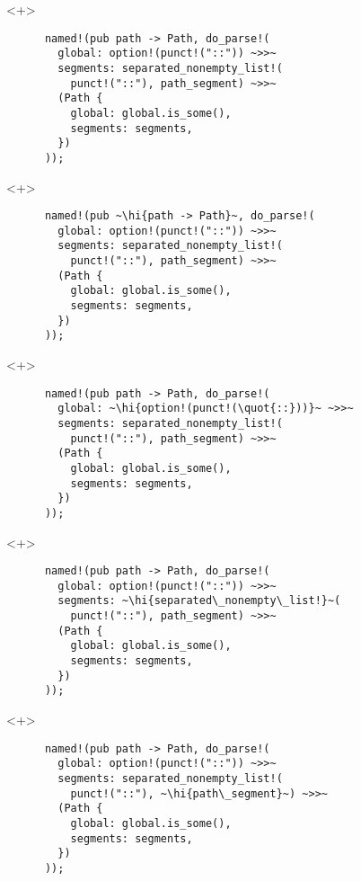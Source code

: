 \documentclass[usepdftitle=false]{beamer}
\renewcommand{\&}{\makebox[\widthof{\ampersand}][c]{\scalebox{0.9}[1.0]{\Book\ampersand}}}
\newcommand{\+}{\makebox[\widthof{+}][c]{\raisebox{-.2\height}{\scalefont{1.5}\Light+}}}
\newcommand{\hi}[1]{%
\tikz[baseline=(A.base)]
 \node[highlighting=0,inner sep=0pt,text depth=0pt] (A) {#1};%
}
\newcommand{\quot}[1]{''#1''}
\begin{document}
\begin{frame}[fragile]
  \begin{onlyenv}<+>
    \begin{verbatim}
      named!(pub path -> Path, do_parse!(
        global: option!(punct!("::")) ~>>~
        segments: separated_nonempty_list!(
          punct!("::"), path_segment) ~>>~
        (Path {
          global: global.is_some(),
          segments: segments,
        })
      ));
    \end{verbatim}
  \end{onlyenv}
  \begin{onlyenv}<+>
    \begin{verbatim}
      named!(pub ~\hi{path -> Path}~, do_parse!(
        global: option!(punct!("::")) ~>>~
        segments: separated_nonempty_list!(
          punct!("::"), path_segment) ~>>~
        (Path {
          global: global.is_some(),
          segments: segments,
        })
      ));
    \end{verbatim}
  \end{onlyenv}
  \begin{onlyenv}<+>
    \begin{verbatim}
      named!(pub path -> Path, do_parse!(
        global: ~\hi{option!(punct!(\quot{::}))}~ ~>>~
        segments: separated_nonempty_list!(
          punct!("::"), path_segment) ~>>~
        (Path {
          global: global.is_some(),
          segments: segments,
        })
      ));
    \end{verbatim}
  \end{onlyenv}
  \begin{onlyenv}<+>
    \begin{verbatim}
      named!(pub path -> Path, do_parse!(
        global: option!(punct!("::")) ~>>~
        segments: ~\hi{separated\_nonempty\_list!}~(
          punct!("::"), path_segment) ~>>~
        (Path {
          global: global.is_some(),
          segments: segments,
        })
      ));
    \end{verbatim}
  \end{onlyenv}
  \begin{onlyenv}<+>
    \begin{verbatim}
      named!(pub path -> Path, do_parse!(
        global: option!(punct!("::")) ~>>~
        segments: separated_nonempty_list!(
          punct!("::"), ~\hi{path\_segment}~) ~>>~
        (Path {
          global: global.is_some(),
          segments: segments,
        })
      ));
    \end{verbatim}

\end{onlyenv}
\end{frame}
\end{document}

